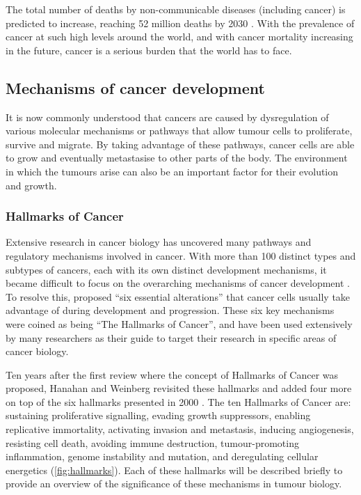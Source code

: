 The total number of deaths by non-communicable diseases (including cancer) is predicted to increase, reaching 52 million deaths by 2030 \citep{WHO2014}.
With the prevalence of cancer at such high levels around the world, and with cancer mortality increasing in the future, cancer is a serious burden that the world has to face.

\subsection{Mechanisms of cancer development}
\label{sub:mechanisms_of_cancer_development}

It is now commonly understood that cancers are caused by dysregulation of various molecular mechanisms or pathways that allow tumour cells to proliferate, survive and migrate.
By taking advantage of these pathways, cancer cells are able to grow and eventually metastasise to other parts of the body.
The environment in which the tumours arise can also be an important factor for their evolution and growth.

\subsubsection{Hallmarks of Cancer}
\label{subsubsec:cancerhallmarks}

Extensive research in cancer biology has uncovered many pathways and regulatory mechanisms involved in cancer.
With more than 100 distinct types and subtypes of cancers, each with its own distinct development mechanisms, it became difficult to focus on the overarching mechanisms of cancer development \citep{Hanahan2000}.
To resolve this, \citet{Hanahan2000} proposed ``six essential alterations'' that cancer cells usually take advantage of during development and progression.
These six key mechanisms were coined as being ``The Hallmarks of Cancer'', and have been used extensively by many researchers as their guide to target their research in specific areas of cancer biology.

Ten years after the first review where the concept of Hallmarks of Cancer was proposed, Hanahan and Weinberg revisited these hallmarks and added four more on top of the six hallmarks presented in 2000 \citep{Hanahan2011}.
The ten Hallmarks of Cancer are: sustaining proliferative signalling, evading growth suppressors, enabling replicative immortality, activating invasion and metastasis, inducing angiogenesis, resisting cell death, avoiding immune destruction, tumour-promoting inflammation, genome instability and mutation, and deregulating cellular energetics (\cref{fig:hallmarks}).
Each of these hallmarks will be described briefly to provide an overview of the significance of these mechanisms in tumour biology.


